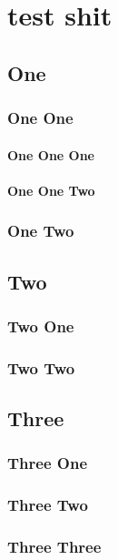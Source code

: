 
\chapter{test shit}
\label{chap:test-shit}

\section{One}
\subsection{One One}

\blindtext

\subsubsection{One One One}

\blindtext

\subsubsection{One One Two}

\blindtext

\subsection{One Two}

\blindtext

\section{Two}
\subsection{Two One}
\subsection{Two Two}
\section{Three}
\subsection{Three One}
\subsection{Three Two}
\subsection{Three Three}
